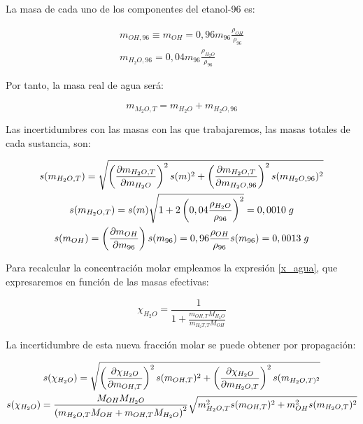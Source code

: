 \documentclass[a4paper,12pt,titlepage]{article}
\begin{document}
La masa de cada uno de los componentes del etanol-96 es:

\begin{equation}
    \begin{gathered}
        m_{OH,96} \equiv m_{OH} = 0,96m_{96}\frac{\rho_{OH}}{\rho_{96}} \\
        m_{H_2O,96} = 0,04m_{96}\frac{\rho_{H_2O}}{\rho_{96}}
    \end{gathered}
\end{equation}

Por tanto, la masa real de agua será:

\begin{equation}
    m_{M_2O,T} = m_{H_2O} + m_{H_2O,96}
\end{equation}

Las incertidumbres con las masas con las que trabajaremos, las masas totales de cada sustancia, son:

\begin{equation}
    \begin{gathered}
        s(m_{H_2O,T}) = \sqrt{\left(\pdv{m_{H_2O,T}}{m_{H_2O}}\right)^2 s(m)^2 + \left(\pdv{m_{H_2O,T}}{m_{H_2O,96}}\right)^2 s(m_{H_2O,96})^2}  \\
        s(m_{H_2O,T})= s(m)\sqrt{1+2\left(0,04\frac{\rho_{H_2O}}{\rho_{96}}\right)^2} = 0,0010 \;g \\
        s(m_{OH}) = \left( \pdv{m_{OH}}{m_{96}}\right) s(m_{96}) = 0,96\frac{\rho_{OH}}{\rho_{96}}s(m_{96}) = 0,0013 \;g
    \end{gathered}
\end{equation}

Para recalcular la concentración molar empleamos la expresión \ref{x_agua}, que expresaremos en función de las masas efectivas:

\begin{equation}
    \chi_{H_2O} = \frac{1}{1+\frac{m_{OH,T}M_{H_2O}}{m_{H_2T,T}M_{OH}}}
\end{equation}

La incertidumbre de esta nueva fracción molar se puede obtener por propagación:

\begin{equation}
    \begin{gathered}
    s(\chi_{H_2O}) = \sqrt{\left(\pdv{\chi_{H_2O}}{m_{OH,T}}\right)^2s(m_{OH,T})^2 + \left(\pdv{\chi_{H_2O}}{m_{H_2O,T}}\right)^2 s(m_{H_2O,T)^2}} \\
    s(\chi_{H_2O}) = \frac{M_{OH}M_{H_2O}}{\left( m_{H_2O,T}M_{OH} + m_{OH,T}M_{H_2O}\right)^2} \sqrt{m^2_{H_2O,T}s(m_{OH,T})^2+m^2_{OH}s(m_{H_2O,T})^2}
    \end{gathered}
\end{equation}
\end{document}
